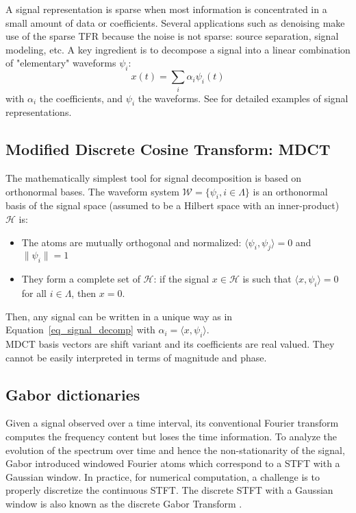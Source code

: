 A signal representation is sparse when most information is concentrated in a small amount of data or coefficients. Several applications such as denoising make use of the sparse TFR because the noise is not sparse: source separation, signal modeling, etc. A key ingredient is to decompose a signal into a linear combination of "elementary" waveforms $\psi_{i}$:
\begin{equation}\label{eq_signal_decomp}
x(t) = \sum_i\alpha_i\psi_i(t)
\end{equation}
with $\alpha_i$ the coefficients, and $\psi_i$ the waveforms. See \cite{mallat2008wavelet,hlawatsch1992linear,wickerhauser1994adapted} for detailed examples of signal representations.\\

\subsection{Modified Discrete Cosine Transform: MDCT}
The mathematically simplest tool for signal decomposition is based on orthonormal bases. The waveform system $\mathcal{W}=\{\psi_i, i \in\Lambda\}$ is an orthonormal basis of the signal space (assumed to be a Hilbert space with an inner-product) $\mathcal{H}$ is:
\begin{itemize}
\item The atoms are mutually orthogonal and normalized: $\langle\psi_i,\psi_j\rangle = 0$ and $\|\psi_i\|=1$
\item They form a complete set of $\mathcal{H}$: if the signal $x\in\mathcal{H}$ is such that $\langle x,\psi_i\rangle=0$ for all $i\in\Lambda$, then $x=0$.
\end{itemize}
Then, any signal can be written in a unique way as in Equation~\eqref{eq_signal_decomp} with $\alpha_i=\langle x,\psi_i\rangle$.\\

MDCT basis vectors are shift variant and its coefficients are real valued. They cannot be easily interpreted in terms of magnitude and phase.

\subsection{Gabor dictionaries}
Given a signal observed over a time interval, its conventional Fourier transform computes the frequency content but loses the time information. To analyze the evolution of the spectrum over time and hence the non-stationarity of the signal, Gabor introduced windowed Fourier atoms which correspond to a \ac{STFT} with a Gaussian window. In practice, for numerical computation, a challenge is to properly discretize the continuous STFT. The discrete STFT with a Gaussian window is also known as the discrete Gabor Transform \cite{gabor1946theory}.


